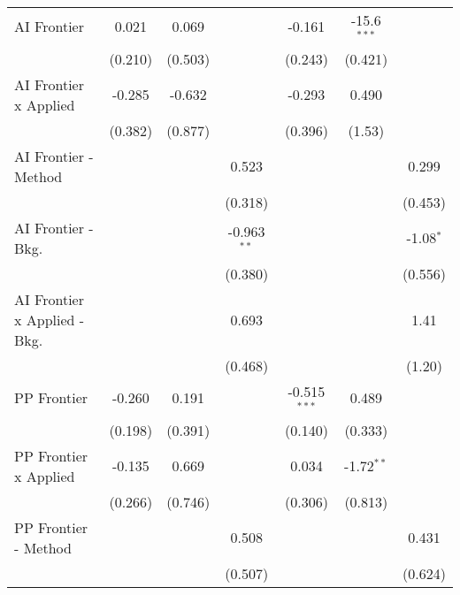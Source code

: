 \begin{tabular}{lcccccc}
   AI Frontier                    & 0.021        & 0.069        &               & -0.161         & -15.6$^{***}$ &   \\   
                                  & (0.210)      & (0.503)      &               & (0.243)        & (0.421)       &   \\   
   AI Frontier x Applied          & -0.285       & -0.632       &               & -0.293         & 0.490         &   \\   
                                  & (0.382)      & (0.877)      &               & (0.396)        & (1.53)        &   \\   
   AI Frontier - Method           &              &              & 0.523         &                &               & 0.299\\   
                                  &              &              & (0.318)       &                &               & (0.453)\\   
   AI Frontier - Bkg.             &              &              & -0.963$^{**}$ &                &               & -1.08$^{*}$\\   
                                  &              &              & (0.380)       &                &               & (0.556)\\   
   AI Frontier x Applied - Bkg.   &              &              & 0.693         &                &               & 1.41\\   
                                  &              &              & (0.468)       &                &               & (1.20)\\   
   PP Frontier                    & -0.260       & 0.191        &               & -0.515$^{***}$ & 0.489         &   \\   
                                  & (0.198)      & (0.391)      &               & (0.140)        & (0.333)       &   \\   
   PP Frontier x Applied          & -0.135       & 0.669        &               & 0.034          & -1.72$^{**}$  &   \\   
                                  & (0.266)      & (0.746)      &               & (0.306)        & (0.813)       &   \\   
   PP Frontier - Method           &              &              & 0.508         &                &               & 0.431\\   
                                  &              &              & (0.507)       &                &               & (0.624)\\   

\end{tabular}

